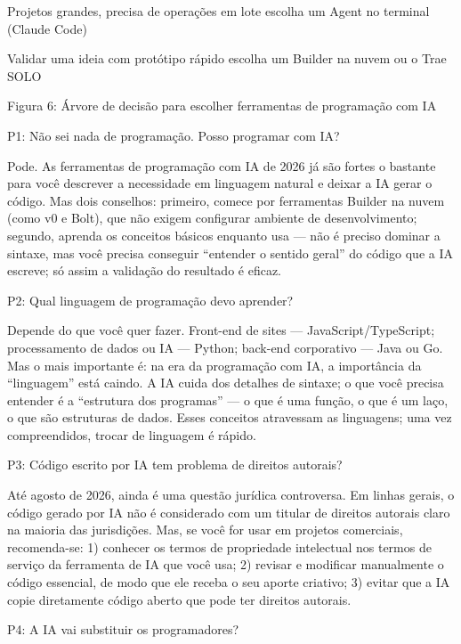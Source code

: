 Projetos grandes, precisa de operações em lote escolha um Agent no terminal (Claude Code)

Validar uma ideia com protótipo rápido escolha um Builder na nuvem ou o Trae SOLO

\begin{center}\small\color{gray}Figura 6: Árvore de decisão para escolher ferramentas de programação com IA\end{center}


P1: Não sei nada de programação. Posso programar com IA?

Pode. As ferramentas de programação com IA de 2026 já são fortes o bastante para você descrever a necessidade em linguagem natural e deixar a IA gerar o código. Mas dois conselhos: primeiro, comece por ferramentas Builder na nuvem (como v0 e Bolt), que não exigem configurar ambiente de desenvolvimento; segundo, aprenda os conceitos básicos enquanto usa — não é preciso dominar a sintaxe, mas você precisa conseguir “entender o sentido geral” do código que a IA escreve; só assim a validação do resultado é eficaz.

P2: Qual linguagem de programação devo aprender?

Depende do que você quer fazer. Front-end de sites — JavaScript/TypeScript; processamento de dados ou IA — Python; back-end corporativo — Java ou Go. Mas o mais importante é: na era da programação com IA, a importância da “linguagem” está caindo. A IA cuida dos detalhes de sintaxe; o que você precisa entender é a “estrutura dos programas” — o que é uma função, o que é um laço, o que são estruturas de dados. Esses conceitos atravessam as linguagens; uma vez compreendidos, trocar de linguagem é rápido.

P3: Código escrito por IA tem problema de direitos autorais?

Até agosto de 2026, ainda é uma questão jurídica controversa. Em linhas gerais, o código gerado por IA não é considerado com um titular de direitos autorais claro na maioria das jurisdições. Mas, se você for usar em projetos comerciais, recomenda-se: 1) conhecer os termos de propriedade intelectual nos termos de serviço da ferramenta de IA que você usa; 2) revisar e modificar manualmente o código essencial, de modo que ele receba o seu aporte criativo; 3) evitar que a IA copie diretamente código aberto que pode ter direitos autorais.

P4: A IA vai substituir os programadores?

